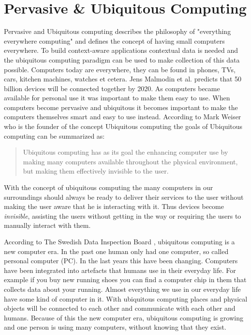 \section{Pervasive \& Ubiquitous Computing}
Pervasive and Ubiquitous computing describes the philosophy of "everything everywhere computing" and defines the concept of having small computers everywhere. To build context-aware applications contextual data is needed and the ubiquitous computing paradigm can be used to make collection of this data possible.
Computers today are everywhere, they can be found in phones, TVs, cars, kitchen machines, watches et cetera. Jens Malmodin et al. \cite{fehske2011global} predicts that 50 billion devices will be connected together by 2020. As computers became available for personal use it was important to make them easy to use. When computers become pervasive and ubiquitous it becomes important to make the computers themselves smart and easy to use instead. According to Mark Weiser who is the founder of the concept Ubiquitous computing the goals of Ubiquitous computing can be summarized as: 

\begin{quotation}
Ubiquitous computing has as its goal the enhancing computer use by making many computers available throughout the physical environment, but making them effectively invisible to the user. \cite{237456}
\end{quotation}

With the concept of ubiquitous computing the many computers in our surroundings should always be ready to deliver their services to the user without making the user aware that he is interacting with it. Thus devices become \emph{invisible}, assisting the users without getting in the way or requiring the users to manually interact with them. 

According to The Swedish Data Inspection Board \cite{datainspect}, ubiquitous computing is a new computer era. In the past one human only had one computer, so called personal computer (PC). In the last years this have been changing. Computers have been integrated into artefacts that humans use in their everyday life. For example if you buy new running shoes you can find a computer chip in them that collects data about your running. Almost everything we use in our everyday life have some kind of computer in it. With ubiquitous computing places and physical objects will be connected to each other and communicate with each other and humans. Because of this the new computer era, ubiquitous computing is growing and one person is using many computers, without knowing that they exist. 

